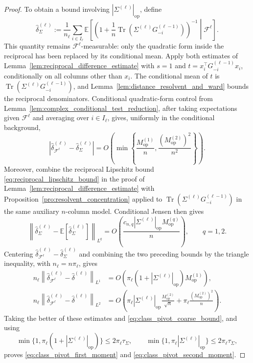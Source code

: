 \documentclass[EJP, preprint, NODS, nobera, nofontexpansion]{ejpecp}
\DeclareMathOperator{\op}{op}
\DeclareMathOperator{\tr}{Tr}
\begin{document}
\begin{proof}
To obtain a bound involving \(|\Sigma^{(\ell)}|_{\op}\), define
\[
    \widehat\delta_\Sigma^{(\ell)}
    :=
    \frac1{n_{\ell}}\sum_{i\in I_{\ell}}
    \mathbb E\!\left[
        \left(
            1+\frac1n
            \tr(\Sigma^{(\ell)}G_{-i}^{(\ell-1)})
        \right)^{-1}
        \middle|\mathcal F^{\ell}
    \right].
\]
This quantity remains \(\mathcal F^{\ell}\)-measurable: only the
quadratic form inside the reciprocal has been replaced by its
conditional mean.
Apply both estimates of Lemma~\ref{lem:reciprocal_difference_estimate}
with \(s=1\) and \(t=x_i^\top G_{-i}^{(\ell-1)}x_i\), conditionally on all
columns other than \(x_i\). The conditional mean of \(t\) is
\(\tr(\Sigma^{(\ell)}G_{-i}^{(\ell-1)})\), and
Lemma~\ref{lem:distance_resolvent_and_ward} bounds the reciprocal
denominators. Conditional quadratic-form control from
Lemma~\ref{lem:complex_conditional_test_reduction}, after taking expectations
given \(\mathcal F^{\ell}\) and averaging over \(i\in I_{\ell}\), gives, uniformly in
the conditional background,
\[
    \left|
        \widehat\delta_{\mathcal F^{\ell}}^{(\ell)}
        -
        \widehat\delta_\Sigma^{(\ell)}
    \right|
    =
    O\!\left(
        \min\left\{
            \frac{M_{\op}^{(1)}}{n},
            \frac{(M_{\op}^{(2)})^2}{n^2}
        \right\}
    \right).
\]
Moreover, combine the reciprocal Lipschitz bound
\eqref{eq:reciprocal_lipschitz_bound} in the proof of
Lemma~\ref{lem:reciprocal_difference_estimate} with
Proposition~\ref{pro:resolvent_concentration} applied to
\(\tr(\Sigma^{(\ell)}G_{-i}^{(\ell-1)})\) in the same auxiliary \(n\)-column model.
Conditional Jensen then gives
\[
    \left\|
        \widehat\delta_\Sigma^{(\ell)}
        -
        \mathbb E[
            \widehat\delta_\Sigma^{(\ell)}
        ]
    \right\|_{L^q}
    =
    O\!\left(
        \frac{
            c_{n,q}
            |\Sigma^{(\ell)}|_{\op}
            M_{\op}^{(q)}
        }{n}
    \right),
    \qquad q=1,2.
\]
Centering
\(\widehat\delta_{\mathcal F^{\ell}}^{(\ell)}
-\widehat\delta_\Sigma^{(\ell)}\)
and combining the two preceding bounds by the triangle inequality,
with \(n_{\ell}=n\pi_{\ell}\), gives
\begin{align*}
    n_{\ell}
    \left\|
        \widehat\delta_{\mathcal F^{\ell}}^{(\ell)}
        -
        \widehat\delta^{(\ell)}
    \right\|_{L^1}
    &=
    O\!\left(
        \pi_{\ell}
        (1+|\Sigma^{(\ell)}|_{\op})
        M_{\op}^{(1)}
    \right),
    \\
    n_{\ell}
    \left\|
        \widehat\delta_{\mathcal F^{\ell}}^{(\ell)}
        -
        \widehat\delta^{(\ell)}
    \right\|_{L^2}
    &=
    O\!\left(
        \pi_{\ell}|\Sigma^{(\ell)}|_{\op}
        \frac{M_{\op}^{(2)}}{\sqrt n}
        +
        \pi_{\ell}\frac{(M_{\op}^{(2)})^2}{n}
    \right).
\end{align*}
Taking the better of these estimates and
\eqref{eq:class_pivot_coarse_bound}, and using
\[
    \min\{1,\pi_{\ell}(1+|\Sigma^{(\ell)}|_{\op})\}
    \leq
    2\pi_{\ell}\tau_\Sigma,
    \qquad
    \min\{1,\pi_{\ell}|\Sigma^{(\ell)}|_{\op}\}
    \leq
    2\pi_{\ell}\tau_\Sigma,
\]
proves \eqref{eq:class_pivot_first_moment} and
\eqref{eq:class_pivot_second_moment}.
\end{proof}
\end{document}
